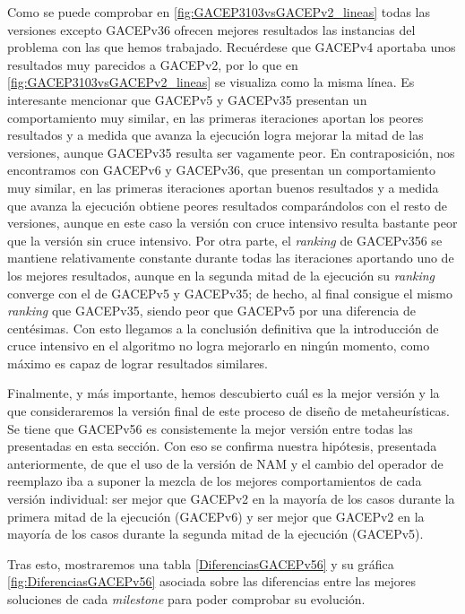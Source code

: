 Como se puede comprobar en \ref{fig:GACEP3103vsGACEPv2_lineas} todas las versiones excepto GACEPv36 ofrecen mejores resultados las instancias del problema con las que hemos trabajado. 
Recuérdese que GACEPv4 aportaba unos resultados muy parecidos a GACEPv2, por lo que en \ref{fig:GACEP3103vsGACEPv2_lineas} se visualiza como la misma línea. 
Es interesante mencionar que GACEPv5 y GACEPv35 presentan un comportamiento muy similar, en las primeras iteraciones aportan los peores resultados y a medida que avanza la ejecución logra mejorar la mitad de las versiones, aunque GACEPv35 resulta ser vagamente peor. 
En contraposición, nos encontramos con GACEPv6 y GACEPv36, que presentan un comportamiento muy similar, en las primeras iteraciones aportan buenos resultados y a medida que avanza la ejecución obtiene peores resultados comparándolos con el resto de versiones, aunque en este caso la versión con cruce intensivo resulta bastante peor que la versión sin cruce intensivo. 
Por otra parte, el \textit{ranking} de GACEPv356 se mantiene relativamente constante durante todas las iteraciones aportando uno de los mejores resultados, aunque en la segunda mitad de la ejecución su \textit{ranking} converge con el de GACEPv5 y GACEPv35; de hecho, al final consigue el mismo \textit{ranking} que GACEPv35, siendo peor que GACEPv5 por una diferencia de centésimas. 
Con esto llegamos a la conclusión definitiva que la introducción de cruce intensivo en el algoritmo no logra mejorarlo en ningún momento, como máximo es capaz de lograr resultados similares. 

Finalmente, y más importante, hemos descubierto cuál es la mejor versión y la que consideraremos la versión final de este proceso de diseño de metaheurísticas. 
Se tiene que GACEPv56 es consistemente la mejor versión entre todas las presentadas en esta sección. 
Con eso se confirma nuestra hipótesis, presentada anteriormente, de que el uso de la versión de NAM y el cambio del operador de reemplazo iba a suponer la mezcla de los mejores comportamientos de cada versión individual: ser mejor que GACEPv2 en la mayoría de los casos durante la primera mitad de la ejecución (GACEPv6) y ser mejor que GACEPv2 en la mayoría de los casos durante la segunda mitad de la ejecución (GACEPv5).

Tras esto, mostraremos una tabla \ref{DiferenciasGACEPv56} y su gráfica \ref{fig:DiferenciasGACEPv56} asociada sobre las diferencias entre las mejores soluciones de cada \textit{milestone} para poder comprobar su evolución. 

